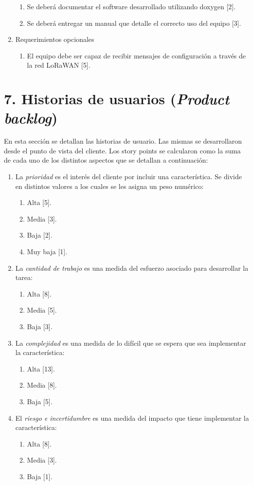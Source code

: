\documentclass[
11pt, %
]{charter}
\begin{document}
\begin{enumerate}
\begin{enumerate}
			\item Se deberá documentar el software desarrollado utilizando doxygen [2].
			\item Se deberá entregar un manual que detalle el correcto uso del equipo [3].
		\end{enumerate}
	\item Requerimientos opcionales
		\begin{enumerate}
			\item El equipo debe ser capaz de recibir mensajes de configuración a través de la red LoRaWAN [5].
		\end{enumerate}
\end{enumerate}
 


\section{7. Historias de usuarios (\textit{Product backlog})}
\label{sec:backlog}

En esta sección se detallan las historias de usuario. Las mismas se desarrollaron desde el punto de vista del cliente. Los story points se calcularon como la suma de cada uno de los distintos aspectos que se detallan a continuación:
\begin{enumerate}
	\item La \textit{prioridad} es el interés del cliente por incluir una característica. Se divide en distintos valores a los cuales se les asigna un peso numérico:
		\begin{enumerate}
	 		\item Alta [5].
	 		\item Media [3].
	 		\item Baja [2].
	 		\item Muy baja [1].
	 	\end{enumerate} 
	 \item La \textit{cantidad de trabajo} es una medida del esfuerzo asociado para desarrollar la tarea:
	 	\begin{enumerate}
	 		\item Alta [8].
	 		\item Media [5].
	 		\item Baja [3].
	 	\end{enumerate}
	 \item La \textit{complejidad} es una medida de lo difícil que se espera que sea implementar la característica:
	 	\begin{enumerate}
	 		\item Alta [13].
	 		\item Media [8].
	 		\item Baja [5].
	 	\end{enumerate}
	 \item El \textit{riesgo e incertidumbre} es una medida del impacto que tiene implementar la característica:
	 	\begin{enumerate}
	 		\item Alta [8].
	 		\item Media [3].
	 		\item Baja [1].
	 	\end{enumerate}
\end{enumerate}
\end{document}
